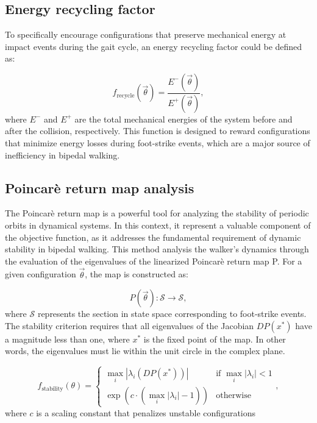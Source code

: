 \subsection{Energy recycling factor}
To specifically encourage configurations that preserve mechanical energy at impact events during the gait cycle, an energy recycling factor could be defined as:

\begin{equation}\label{eq:opt_energy_efficiency}
    f_{\text{recycle}}(\vec{\theta}) = \frac{E^-(\vec{\theta})}{E^+(\vec{\theta})},
\end{equation}
where $E^-$ and $E^+$ are the total mechanical energies of the system before and after the collision, respectively.
This function is designed to reward configurations that minimize energy losses during foot-strike events, which are a major source of inefficiency in bipedal walking.

\subsection{Poincarè return map analysis}
The Poincarè return map is a powerful tool for analyzing the stability of periodic orbits in dynamical systems.
In this context, it represent a valuable component of the objective function, as it addresses the fundamental requirement of dynamic stability in bipedal walking.
This method analysis the walker's dynamics through the evaluation of the eigenvalues of the linearized Poincarè return map P.
For a given configuration $\vec{\theta}$, the map is constructed as:

\begin{equation}\label{eq:opt_poincare_map}
    P(\vec{\theta}): \mathcal{S} \longrightarrow \mathcal{S},
\end{equation}
where $\mathcal{S}$ represents the section in state space corresponding to foot-strike events.
The stability criterion requires that all eigenvalues of the Jacobian $DP(x^*)$ have a magnitude less than one, where $x^*$ is the fixed point of the map. 
In other words, the eigenvalues must lie within the unit circle in the complex plane.

\begin{equation}\label{eq:opt_stability}
    f_{\text{stability}}(\theta) =
    \begin{cases}
        \max_i|\lambda_i(DP(x^*))| & \text{if } \max_i|\lambda_i| < 1\\
        \exp(c \cdot (\max_i|\lambda_i| - 1)) & \text{otherwise}
    \end{cases},
\end{equation}
where $c$ is a scaling constant that penalizes unstable configurations


